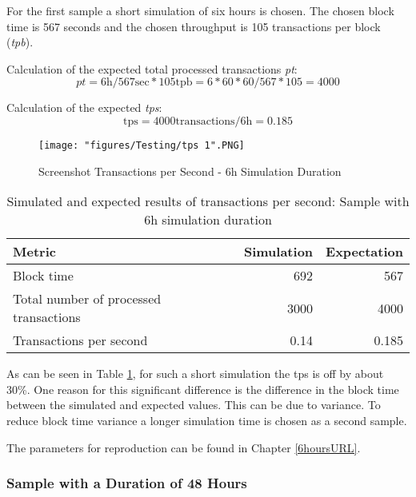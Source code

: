 For the first sample a short simulation of six hours is chosen. The chosen block time is 567 seconds and the chosen throughput is 105 transactions per block (\textit{tpb}).

Calculation of the expected total processed transactions \textit{pt}:
\begin{equation}
\textit{pt} = 6 \text{h} / 567 \text{sec} * 105 \text{tpb} = 6*60*60/567 * 105 = 4000
\end{equation}

Calculation of the expected \textit{tps}:
\begin{equation}
\text{tps} = 4000 \text{transactions} / 6 \text{h} = 0.185
\end{equation}

\begin{figure}[!htb]
\centering
\texttt{[image: "figures/Testing/tps 1".PNG]}
\caption{Screenshot Transactions per Second - 6h Simulation Duration\label{fig:tpsSimulation6h}}
\end{figure}

\begin{table}[ht]
    \caption{Simulated and expected results of transactions per second: Sample with 6h simulation duration\label{table:tps6hsimulation}}
\centering
\begin{adjustbox}{width=0.8\textwidth}
    \begin{tabular}{| l | r | r |}
    \hline
    \textbf{Metric} & \textbf{Simulation} & \textbf{Expectation}\\ \hline
    Block time & 692 & 567\\ \hline
    Total number of processed transactions & 3000 & 4000 \\ \hline
    Transactions per second & 0.14 & 0.185\\ \hline
    \end{tabular}
\end{adjustbox}
\end{table} 

As can be seen in Table \ref{table:tps6hsimulation}, for such a short simulation the tps is off by about 30\%. One reason for this significant difference is the difference in the block time between the simulated and expected values. This can be due to variance. To reduce block time variance a longer simulation time is chosen as a second sample.

The parameters for reproduction can be found in Chapter \ref{6hoursURL}.

\subsubsection{Sample with a Duration of 48 Hours}

